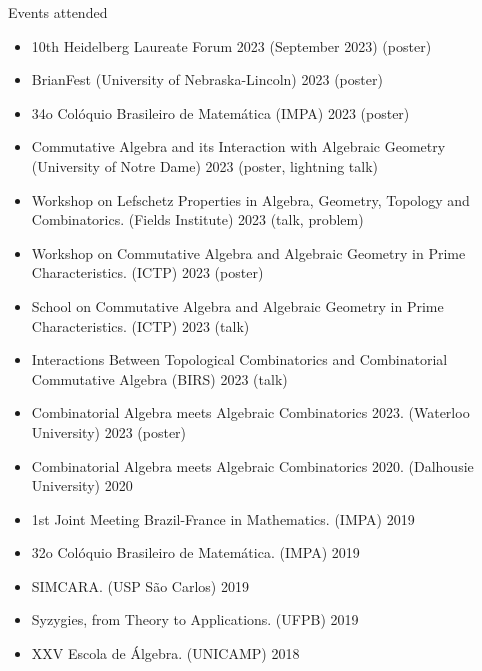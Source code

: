 \documentclass{resume} %
\begin{document}
\begin{rSection}{Events attended}

    \begin{itemize}[label={}]
        \item 10th Heidelberg Laureate Forum 2023 (September 2023) (poster)
        \item BrianFest (University of Nebraska-Lincoln) 2023 (poster)
        \item 34o Colóquio Brasileiro de Matemática (IMPA) 2023 (poster)
        \item Commutative Algebra and its Interaction with Algebraic Geometry (University of Notre Dame) 2023 (poster, lightning talk)
        \item Workshop on Lefschetz Properties in Algebra, Geometry, Topology and Combinatorics. (Fields Institute) 2023 (talk, problem)
        \item Workshop on Commutative Algebra and Algebraic Geometry in Prime Characteristics. (ICTP) 2023 (poster)
        \item School on Commutative Algebra and Algebraic Geometry in Prime Characteristics. (ICTP) 2023 (talk)
        \item Interactions Between Topological Combinatorics and Combinatorial Commutative Algebra (BIRS) 2023 (talk)
        \item Combinatorial Algebra meets Algebraic Combinatorics 2023. (Waterloo University) 2023 (poster)
        \item Combinatorial Algebra meets Algebraic Combinatorics 2020. (Dalhousie University) 2020
        \item 1st Joint Meeting Brazil-France in Mathematics. (IMPA) 2019
        \item 32o Colóquio Brasileiro de Matemática. (IMPA) 2019
        \item SIMCARA. (USP São Carlos) 2019
        \item Syzygies, from Theory to Applications. (UFPB) 2019
        \item XXV Escola de Álgebra. (UNICAMP) 2018
    \end{itemize}

\end{rSection}
\end{document}

